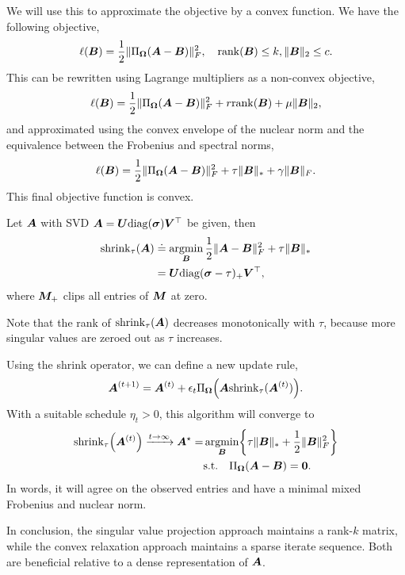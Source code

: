 We will use this to approximate the objective by a convex function. We have the following
objective, \[
    \ell(\bm{B}) = \frac{1}{2} \| \Pi_{\bm{\Omega}} (\bm{A} - \bm{B}) \|_F^2, \quad \mathrm{rank}(\bm{B}) \leq k, \| \bm{B} \|_2 \leq c.
\]
This can be rewritten using Lagrange multipliers as a non-convex objective, \[
    \ell(\bm{B}) = \frac{1}{2} \| \Pi_{\bm{\Omega}}(\bm{A} - \bm{B}) \|_F^2 + r \mathrm{rank}(\bm{B}) + \mu \| \bm{B} \|_2,
\]
and approximated using the convex envelope of the nuclear norm and the equivalence between the
Frobenius and spectral norms, \[
    \ell(\bm{B}) = \frac{1}{2} \| \Pi_{\bm{\Omega}}(\bm{A} - \bm{B}) \|_F^2 + \tau \| \bm{B} \|_* + \gamma \| \bm{B} \|_F.
\]
This final objective function is convex.

\begin{theorem}
    Let $\bm{A}$ with SVD $\bm{A} = \bm{U} \mathrm{diag}(\bm{\sigma}) \bm{V}^\top$ be given, then
    \begin{align*}
        \mathrm{shrink}_{\tau}(\bm{A}) & \doteq \operatorname*{argmin}_{\bm{B}} \frac{1}{2} \| \bm{A} - \bm{B} \|_F^2 + \tau \| \bm{B} \|_* \\
                                        & = \bm{U}\mathrm{diag}(\bm{\sigma} - \tau)_+ \bm{V}^\top,
    \end{align*}
    where $\bm{M}_+$ clips all entries of $\bm{M}$ at zero.
\end{theorem}
Note that the rank of $\mathrm{shrink}_{\tau}(\bm{A})$ decreases monotonically with $\tau$, because
more singular values are zeroed out as $\tau$ increases.

Using the shrink operator, we can define a new update rule, \[
    \mat{A}^{(t+1)} = \mat{A}^{(t)} + \epsilon_t \Pi_{\mat{\Omega}}\lft( \mat{A} \mathrm{shrink}_{\tau}(\mat{A}^{(t)}) \rgt).
\]
With a suitable schedule $\eta_t > 0$, this algorithm will converge to
\begin{align*}
    \mathrm{shrink}_{\tau}\lft( \mat{A}^{(t)} \rgt) \xrightarrow{t\to \infty} \mat{A}^\star = & \argmin_{\mat{B}} \lft\{ \tau \| \mat{B} \|_* + \frac{1}{2} \| \mat{B} \|_F^2 \rgt\} \\
                                                                                              & \mathrm{s.t.} \quad \Pi_{\mat{\Omega}}(\mat{A} - \mat{B}) = \mat{0}.
\end{align*}
In words, it will agree on the observed entries and have a minimal mixed Frobenius and nuclear
norm.

In conclusion, the singular value projection approach maintains a rank-$k$ matrix, while the convex
relaxation approach maintains a sparse iterate sequence. Both are beneficial relative to a dense
representation of $\bm{A}$.

